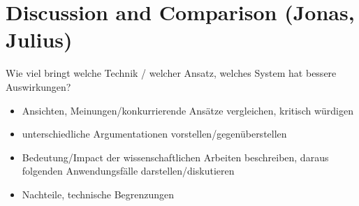 \section{Discussion and Comparison (Jonas, Julius)}

Wie viel bringt welche Technik / welcher Ansatz, welches System
hat bessere Auswirkungen?

\begin{itemize}
    \item Ansichten, Meinungen/konkurrierende Ansätze vergleichen, kritisch würdigen
    \item unterschiedliche Argumentationen vorstellen/gegenüberstellen
    \item Bedeutung/Impact der wissenschaftlichen Arbeiten beschreiben, daraus folgenden Anwendungsfälle darstellen/diskutieren
    \item Nachteile, technische Begrenzungen

\end{itemize}
